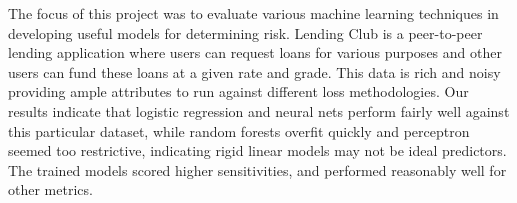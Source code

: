 The focus of this project was to evaluate various machine learning techniques in developing useful models for determining risk. Lending Club is a peer-to-peer lending application where users can request loans for various purposes and other users can fund these loans at a given rate and grade. This data is rich and noisy providing ample attributes to run against different loss methodologies. Our results indicate that logistic regression and neural nets perform fairly well against this particular dataset, while random forests overfit quickly and perceptron seemed too restrictive, indicating rigid linear models may not be ideal predictors. The trained models scored higher sensitivities, and performed reasonably well for other metrics.